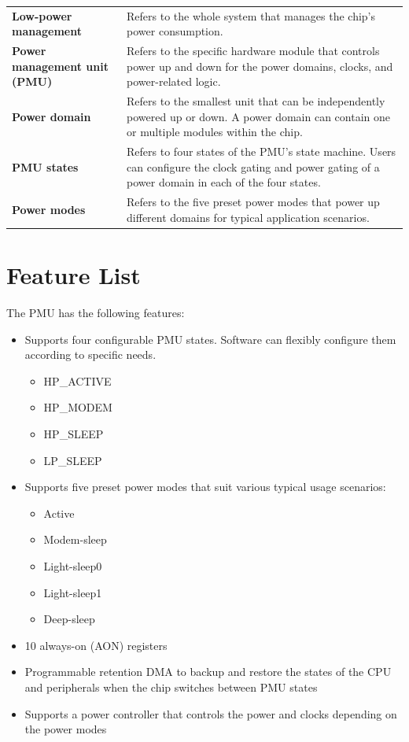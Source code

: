 \documentclass[main\_\_EN.tex]{subfiles}
\begin{document}
\begin{longtable}[c]{ R{6cm} p{10cm} }
\textbf{Low-power management} & Refers to the whole system that manages the chip's power consumption. \\
\textbf{Power management unit (PMU)} & Refers to the specific hardware module that controls power up and down for the power domains, clocks, and power-related logic. \\
\textbf{Power domain} & Refers to the smallest unit that can be independently powered up or down. A power domain can contain one or multiple modules within the chip. \\
\textbf{PMU states} & Refers to four states of the PMU's state machine. Users can configure the clock gating and power gating of a power domain in each of the four states.\\
\textbf{Power modes} & Refers to the five preset power modes that power up different domains for typical application scenarios.\\
\end{longtable}

\section{Feature List}

The PMU has the following features:

\begin{itemize}
    \item Supports four configurable PMU states. Software can flexibly configure them according to specific needs.
        \begin{itemize}
        \item HP\_ACTIVE
        \item HP\_MODEM
        \item HP\_SLEEP
        \item LP\_SLEEP
        \end{itemize}
    \item Supports five preset power modes that suit various typical usage scenarios:
    \begin{itemize}
        \item Active
        \item Modem-sleep
        \item Light-sleep0
        \item Light-sleep1
        \item Deep-sleep
    \end{itemize}
    \item 10 always-on (AON) registers
    \item Programmable retention DMA to backup and restore the states of the CPU and peripherals when the chip switches between PMU states
    \item Supports a power controller that controls the power and clocks depending on the power modes
\end{itemize}
\end{document}
